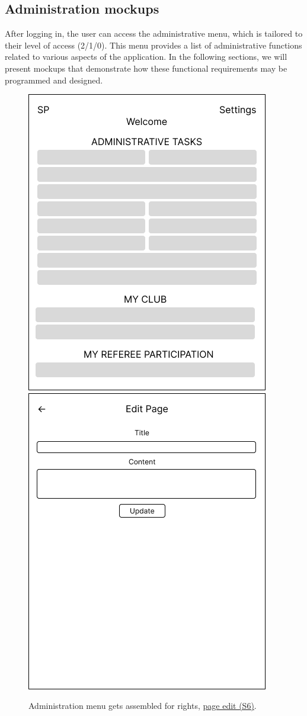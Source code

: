 \subsection*{Administration mockups}
After logging in, the user can access the administrative menu, which is tailored to their level of access (2/1/0). This menu provides a list of administrative functions related to various aspects of the application. In the following sections, we will present mockups that demonstrate how these functional requirements may be programmed and designed.
\begin{figure}[h]	
	\centering	
\includegraphics[scale=0.457]{img/A-administrace.png}
\includegraphics[scale=0.457]{img/A-edit-page.png}
\caption{Administration menu gets assembled for rights, \underline{page edit (S6)}.}
\label{fig2.4:feprivatepages1}
\end{figure}
